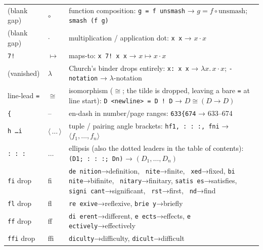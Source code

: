 \documentclass[10pt]{article}
\newcommand{\ex}[1]{\texttt{#1}}                      %
\newcommand{\uni}[1]{$#1$}                            %
\begin{document}
{\begin{longtable}{@{}p{2.2cm}p{1.7cm}p{12.3cm}@{}}
(blank gap)   & \uni{\circ}    & function composition: \ex{g = f  unsmash} → $g = f\circ\mathrm{unsmash}$; \ex{smash  (f  g)} \\
(blank gap)   & \uni{\cdot}    & multiplication / application dot: \ex{x  x} → $x\cdot x$ \\
\ex{7!}       & \uni{\mapsto}  & maps-to: \ex{x 7! x  x} → $x \mapsto x\cdot x$ \\
(vanished)    & \uni{\lambda}  & Church's binder drops entirely: \ex{x: x  x} → $\lambda x.\,x\cdot x$; \ex{-notation} → $\lambda$-notation \\
line-lead \ex{=} & \uni{\cong} & isomorphism ($\cong$; the tilde is dropped, leaving a bare \ex{=} at line start): \ex{D <newline> = D ! D} → $D \cong (D \to D)$ \\
\ex{\{}       & \uni{\text{--}} & en-dash in number/page ranges: \ex{633\{674} → 633–674 \\
\ex{h \ldots i} & \uni{\langle\,\ldots\,\rangle} & tuple / pairing angle brackets: \ex{hf1, : : :, fni} → $\langle f_1,\ldots,f_n\rangle$ \\
\ex{: : :}    & \uni{\ldots}   & ellipsis (also the dotted leaders in the table of contents): \ex{(D1; : : :; Dn)} → $(D_1,\ldots,D_n)$ \\
\ex{fi} drop  & fi & \ex{de nition}→definition, \ex{ nite}→finite, \ex{ xed}→fixed, \ex{bi nite}→bifinite, \ex{ nitary}→finitary, \ex{satis es}→satisfies, \ex{signi cant}→significant, \ex{ rst}→first, \ex{ nd}→find \\
\ex{fl} drop  & fl & \ex{re exive}→reflexive, \ex{brie y}→briefly \\
\ex{ff} drop  & ff & \ex{di erent}→different, \ex{e ects}→effects, \ex{e ectively}→effectively \\
\ex{ffi} drop & ffi & \ex{diculty}→difficulty, \ex{dicult}→difficult \\
\bottomrule
\end{longtable}
}

\vspace{4pt}

\end{document}
